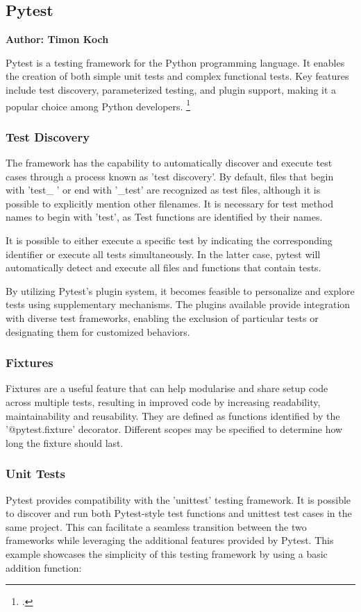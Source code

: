 \subsection{Pytest}
\textbf{Author: Timon Koch}

Pytest is a testing framework for the Python programming language. It enables the creation of both simple unit tests and complex functional tests. Key features include test discovery, parameterized testing, and plugin support, making it a popular choice among Python developers. \footcite{pytest_documentation}
 
\subsubsection{Test Discovery}
The framework has the capability to automatically discover and execute test cases through a process known as 'test discovery'. By default, files that begin with 'test\_ ' or end with '\_test' are recognized as test files, although it is possible to explicitly mention other filenames. It is necessary for test method names to begin with 'test', as Test functions are identified by their names.

It is possible to either execute a specific test by indicating the corresponding identifier or execute all tests simultaneously. In the latter case, pytest will automatically detect and execute all files and functions that contain tests.  

By utilizing Pytest's plugin system, it becomes feasible to personalize and explore tests using supplementary mechanisms. The plugins available provide integration with diverse test frameworks, enabling the exclusion of particular tests or designating them for customized behaviors.

\subsubsection{Fixtures}
Fixtures are a useful feature that can help modularise and share setup code across multiple tests, resulting in improved code by increasing readability, maintainability and reusability.
They are defined as functions identified by the '@pytest.fixture' decorator. Different scopes may be specified to determine how long the fixture should last.

\subsubsection{Unit Tests}
Pytest provides compatibility with the 'unittest' testing framework. It is possible to discover and run both Pytest-style test functions and unittest test cases in the same project. This can facilitate a seamless transition between the two frameworks while leveraging the additional features provided by Pytest. This example showcases the simplicity of this testing framework by using a basic addition function:

